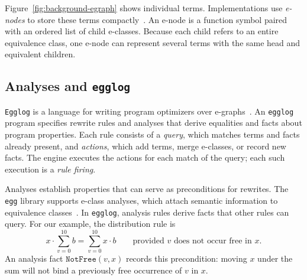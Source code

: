 Figure~\ref{fig:background-egraph} shows individual terms.
Implementations use \emph{e-nodes} to store these terms compactly~\cite{egg}.
An e-node is a function symbol paired with an ordered list of child e-classes.
Because each child refers to an entire equivalence class,
  one e-node can represent several terms with the same head and equivalent children.

\subsection{Analyses and \texttt{egglog}}
\label{sec:background-egglog}

\texttt{Egglog} is a language for writing program optimizers over e-graphs~\cite{egglog}.
An \texttt{egglog} program specifies rewrite rules and analyses
  that derive equalities and facts about program properties.
Each rule consists of a \emph{query}, which matches terms and facts already present,
  and \emph{actions}, which add terms, merge e-classes, or record new facts.
The engine executes the actions for each match of the query;
  each such execution is a \emph{rule firing}.

Analyses establish properties that can serve as preconditions for rewrites.
The \texttt{egg} library supports e-class analyses,
  which attach semantic information to equivalence classes~\cite{egg}.
In \texttt{egglog}, analysis rules derive facts that other rules can query.
For our example, the distribution rule is
\begin{equation}
  x\cdot\sum_{v=0}^{10} b
  =\sum_{v=0}^{10} x\cdot b
  \qquad\text{provided $v$ does not occur free in $x$.}
  \label{eq:distribution-rule}
\end{equation}
An analysis fact $\mathtt{NotFree}(v,x)$ records this precondition:
  moving $x$ under the sum will not bind a previously free occurrence of $v$ in $x$.

